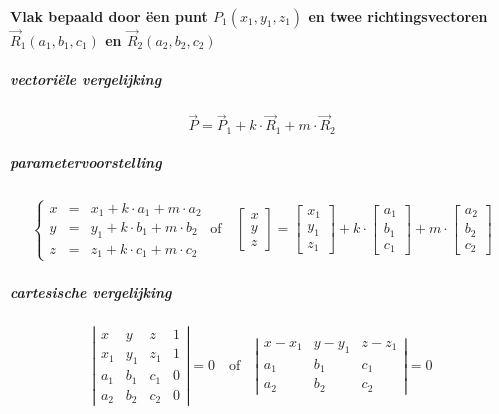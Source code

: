 \paragraph{Vlak bepaald door ëen punt $P_1(x_1,y_1,z_1)$ en twee richtingsvectoren $\vec R_1(a_1,b_1,c_1)$ en $\vec R_2(a_2,b_2,c_2)$}
\label{sec:VlakPuntRichtingRichting}
 \subparagraph{vectoriële vergelijking}
  \label{sec:VlakPuntRichtingRichtingVECTOR}
 \[
 \vec P = \vec P_1 + k \cdot \vec R_1  + m \cdot \vec R_2
 \]
 \subparagraph{parametervoorstelling}
  \label{sec:VlakPuntRichtingRichtingPARAM}
 \[
   \begin{array}{lr}
     \left\{
       \begin{array}{rcl}
         x &=& x_1 + k \cdot a_1 + m \cdot a_2\\
         y &=& y_1 + k \cdot b_1 + m \cdot b_2\\
         z &=& z_1 + k \cdot c_1 + m \cdot c_2
       \end{array}%
     \right.
     \  \textrm{of} \  &%
     \left[
       \begin{array}{c}
         x\\ y\\ z
       \end{array}
     \right]
     =
     \left[
       \begin{array}{c}
         x_1\\ y_1\\ z_1
       \end{array}
     \right]
     + k \cdot
     \left[
       \begin{array}{c}
         a_1\\ b_1\\ c_1
       \end{array}
     \right]
     + m \cdot
     \left[
       \begin{array}{c}
         a_2\\ b_2\\ c_2
       \end{array}
     \right]
   \end{array}
 \]
 \subparagraph{cartesische vergelijking}
  \label{sec:VlakPuntRichtingRichtingCART}
 \[
   \left|
     \begin{array}{cccc}
       x  &  y  &  z  & 1\\
      x_1 & y_1 & z_1 & 1\\
      a_1 & b_1 & c_1 & 0\\
      a_2 & b_2 & c_2 & 0
     \end{array}
   \right|
    = 0%
    \quad \textrm{of} \quad
   \left|
     \begin{array}{ccc}
       x - x_1 & y - y_1 & z - z_1 \\
       a_1 & b_1 & c_1\\
       a_2 & b_2 & c_2
     \end{array}
   \right| 
    = 0
 \]
